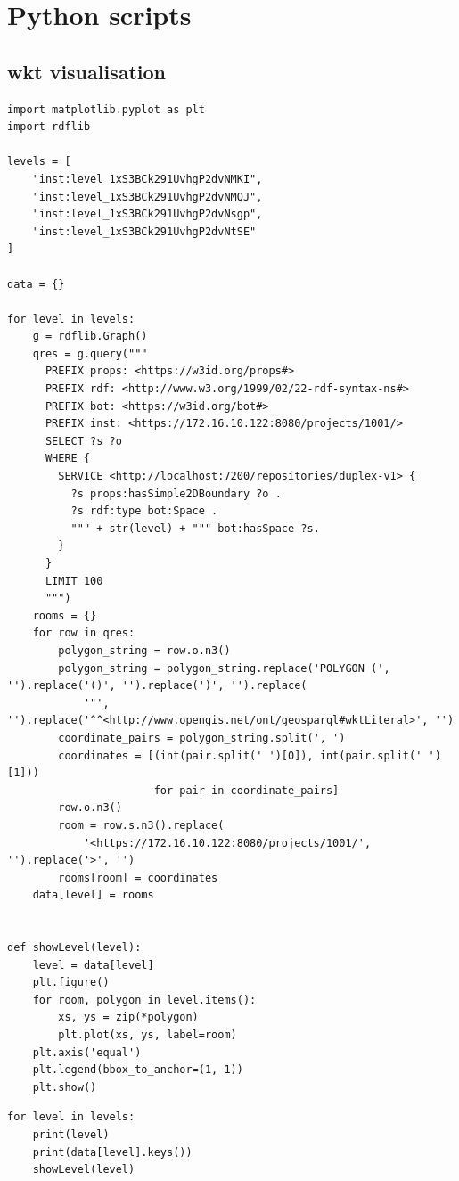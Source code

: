 \chapter{Python scripts}

\section{\acs{wkt} visualisation}
\begin{verbatim}
import matplotlib.pyplot as plt
import rdflib

levels = [
    "inst:level_1xS3BCk291UvhgP2dvNMKI",
    "inst:level_1xS3BCk291UvhgP2dvNMQJ",
    "inst:level_1xS3BCk291UvhgP2dvNsgp",
    "inst:level_1xS3BCk291UvhgP2dvNtSE"
]

data = {}

for level in levels:
    g = rdflib.Graph()
    qres = g.query("""
      PREFIX props: <https://w3id.org/props#>
      PREFIX rdf: <http://www.w3.org/1999/02/22-rdf-syntax-ns#>
      PREFIX bot: <https://w3id.org/bot#>
      PREFIX inst: <https://172.16.10.122:8080/projects/1001/>
      SELECT ?s ?o
      WHERE {
        SERVICE <http://localhost:7200/repositories/duplex-v1> {
          ?s props:hasSimple2DBoundary ?o .
          ?s rdf:type bot:Space .
          """ + str(level) + """ bot:hasSpace ?s.
        }
      }
      LIMIT 100
      """)
    rooms = {}
    for row in qres:
        polygon_string = row.o.n3()
        polygon_string = polygon_string.replace('POLYGON (', '').replace('()', '').replace(')', '').replace(
            '"', '').replace('^^<http://www.opengis.net/ont/geosparql#wktLiteral>', '')
        coordinate_pairs = polygon_string.split(', ')
        coordinates = [(int(pair.split(' ')[0]), int(pair.split(' ')[1]))
                       for pair in coordinate_pairs]
        row.o.n3()
        room = row.s.n3().replace(
            '<https://172.16.10.122:8080/projects/1001/', '').replace('>', '')
        rooms[room] = coordinates
    data[level] = rooms


def showLevel(level):
    level = data[level]
    plt.figure()
    for room, polygon in level.items():
        xs, ys = zip(*polygon)
        plt.plot(xs, ys, label=room)
    plt.axis('equal')
    plt.legend(bbox_to_anchor=(1, 1))
    plt.show()
\end{verbatim}

\begin{verbatim}
for level in levels:
    print(level)
    print(data[level].keys())
    showLevel(level)
\end{verbatim}

